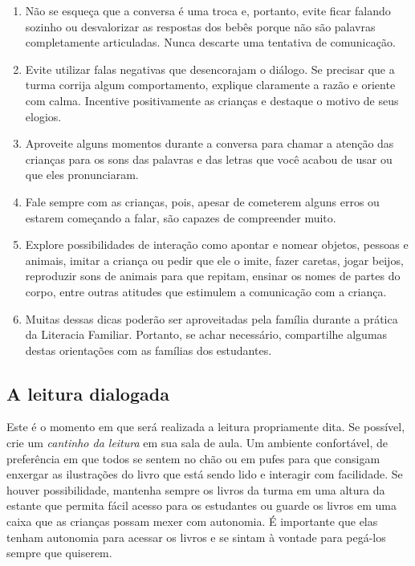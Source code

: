 \documentclass[11pt]{extarticle}
\begin{document}
{{\begin{enumerate}
\item Não se esqueça que a conversa é uma troca e, portanto, 
evite ficar falando sozinho ou desvalorizar as respostas dos 
bebês porque não são palavras completamente articuladas. 
Nunca descarte uma tentativa de comunicação. 

\item Evite utilizar falas negativas que desencorajam o diálogo. 
Se precisar que a turma corrija algum comportamento, explique 
claramente a razão e oriente com calma. Incentive positivamente 
as crianças e destaque o motivo de seus elogios. 

\item Aproveite alguns momentos durante a conversa para chamar 
a atenção das crianças para os sons das palavras e das letras que você 
acabou de usar ou que eles pronunciaram.  

\item Fale sempre com as crianças, pois, apesar de cometerem alguns erros
ou estarem começando a falar, são capazes de compreender muito.

\item Explore possibilidades de interação como apontar e 
nomear objetos, pessoas e animais, imitar a criança ou pedir que 
ele o imite, fazer caretas, jogar beijos, reproduzir sons de 
animais para que repitam, ensinar os nomes de partes do corpo, 
entre outras atitudes que estimulem a comunicação com a criança. 

\item Muitas dessas dicas poderão ser aproveitadas pela 
família durante a prática da Literacia Familiar. Portanto, 
se achar necessário, compartilhe algumas destas orientações 
com as famílias dos estudantes.
\end{enumerate}


\subsection{A leitura dialogada}
Este é o momento em que será realizada a leitura propriamente dita. 
Se possível, crie um \textit{cantinho da leitura} em sua sala de aula. Um 
ambiente confortável, de preferência em que todos se sentem no chão ou 
em pufes para que consigam enxergar as ilustrações do livro que está 
sendo lido e interagir com facilidade. Se houver possibilidade, mantenha 
sempre os livros da turma em uma altura da estante que permita fácil 
acesso para os estudantes ou guarde os livros em uma caixa que as crianças 
possam mexer com autonomia. É importante que elas tenham autonomia para 
acessar os livros e se sintam à vontade para pegá-los sempre que quiserem. 

}}
\end{document}
